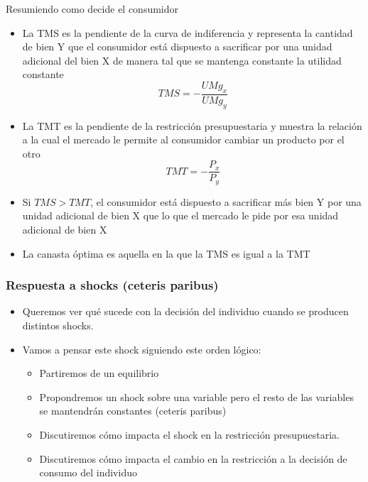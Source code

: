 \documentclass{beamer}
\begin{document}
\begin{frame}{Resumiendo como decide el consumidor}
    \begin{itemize}
        \item La TMS es la pendiente de la curva de indiferencia y representa la cantidad de bien Y que el consumidor está dispuesto a sacrificar por una unidad adicional del bien X de manera tal que se mantenga constante la utilidad constante
        \[TMS = - \frac{UMg_x}{UMg_y}\]
        \item La TMT es la pendiente de la restricción presupuestaria y muestra la relación a la cual el mercado le permite al consumidor cambiar un producto por el otro
        \[TMT = - \frac{P_x}{P_y}\]
        \item Si $TMS > TMT$, el consumidor está dispuesto a sacrificar más bien Y por una unidad adicional de bien X que lo que el mercado le pide por esa unidad adicional de bien X
        \item La canasta óptima es aquella en la que la TMS es igual a la TMT
    \end{itemize}
\end{frame}

\begin{frame}
\frametitle{Respuesta a shocks (ceteris paribus)}
\begin{itemize}
    \item Queremos ver qué sucede con la decisión del individuo cuando se producen distintos shocks. \vspace{2mm}
    \item Vamos a pensar este shock siguiendo este orden lógico:
    \begin{itemize}
        \item Partiremos de un equilibrio
        \item Propondremos un shock sobre una variable pero el resto de las variables se mantendrán constantes (ceteris paribus)
        \item Discutiremos cómo impacta el shock en la restricción presupuestaria.      
        \item Discutiremos cómo impacta el cambio en la restricción a la decisión de consumo del individuo
    \end{itemize}
\end{itemize} 
\end{frame}
\end{document}
